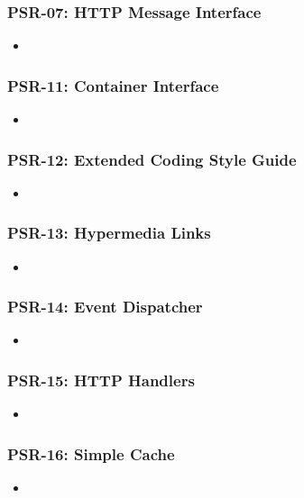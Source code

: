 \subsubsection{PSR-07: HTTP Message Interface}
\label{subsubsec:psr07}
\begin{itemize}
	\item
\end{itemize}

\subsubsection{PSR-11: Container Interface}
\label{subsubsec:psr11}
\begin{itemize}
	\item
\end{itemize}

\subsubsection{PSR-12: Extended Coding Style Guide}
\label{subsubsec:psr12}
\begin{itemize}
	\item
\end{itemize}

\subsubsection{PSR-13: Hypermedia Links}
\label{subsubsec:psr13}
\begin{itemize}
	\item
\end{itemize}

\subsubsection{PSR-14: Event Dispatcher}
\label{subsubsec:psr14}
\begin{itemize}
	\item
\end{itemize}

\subsubsection{PSR-15: HTTP Handlers}
\label{subsubsec:psr15}
\begin{itemize}
	\item
\end{itemize}

\subsubsection{PSR-16: Simple Cache}
\label{subsubsec:psr16}
\begin{itemize}
	\item
\end{itemize}


